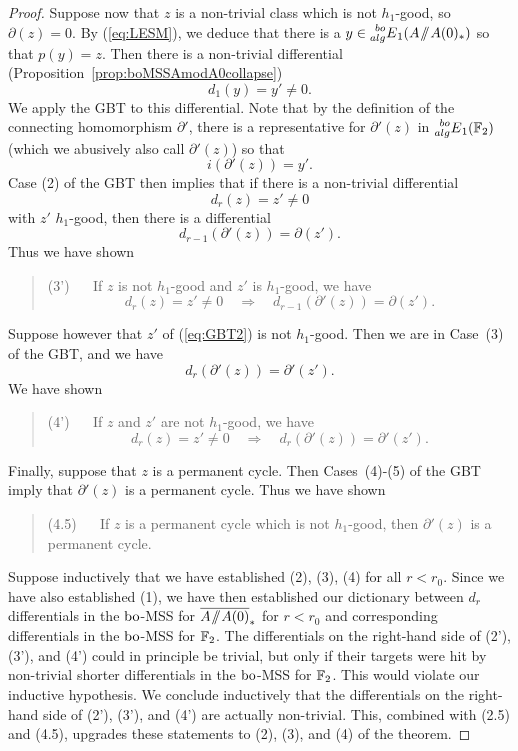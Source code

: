 \begin{proof}
Suppose now that $z$ is a non-trivial class which is not $h_1$-good, so $\partial(z) = 0$.  By (\ref{eq:LESM}), we deduce that there is a $y \in \prescript{bo}{alg}{E}_1(A \! \sslash \! A(0)_*)$ so that $p(y) = z$.  Then there is a non-trivial differential (Proposition~\ref{prop:boMSSAmodA0collapse}) 
$$ d_1(y) = y' \ne 0. $$
We apply the GBT to this differential.  Note that by the definition of the connecting homomorphism $\partial'$, there is a representative for $\partial'(z)$ in $\prescript{bo}{alg}{E}_{1}(\mathbb{F}_2)$ (which we abusively also call $\partial'(z)$) so that
$$ i(\partial'(z)) = y'. $$
Case (2) of the GBT then implies that if there is a non-trivial differential
\begin{equation}\label{eq:GBT2}
d_{r}(z) = z' \ne 0
\end{equation}
with $z'$ $h_1$-good,
then there is a differential
$$ d_{r-1}(\partial'(z)) = \partial(z'). $$
Thus we have shown
\begin{quote}
(3') $\quad$ If $z$ is not $h_1$-good and $z'$ is $h_1$-good, we have
$$ d_{r}(z) = z' \ne 0 \quad \Rightarrow \quad d_{r-1}(\partial'(z)) = \partial(z'). $$
\end{quote}
Suppose however that $z'$ of (\ref{eq:GBT2}) is not $h_1$-good.  Then we are in Case~(3) of the GBT, and we have
$$ d_r(\partial'(z)) = \partial'(z'). $$  
We have shown
\begin{quote}
(4') $\quad$ If $z$ and $z'$ are not $h_1$-good, we have
$$ d_{r}(z) = z' \ne 0 \quad \Rightarrow \quad d_{r}(\partial'(z)) = \partial'(z'). $$
\end{quote}
Finally, suppose that $z$ is a permanent cycle.  Then Cases~(4)-(5) of the GBT imply that $\partial'(z)$
is a permanent cycle.  Thus we have shown
\begin{quote}
(4.5) $\quad$ If $z$ is a permanent cycle which is not $h_1$-good, then $\partial'(z)$ is a permanent cycle.
\end{quote}



Suppose inductively that we have established (2), (3), (4) for all $r < r_0$. Since we have also established (1), we have then established our dictionary between $d_r$ differentials in the $\mathrm{bo}$-MSS for $\AA0$ for $r < r_0$ and corresponding differentials in the $\mathrm{bo}$-MSS for $\mathbb{F}_2$.  The differentials on the right-hand side of (2'), (3'), and (4') could in principle be trivial, but only if their targets were hit by non-trivial shorter differentials in the $\mathrm{bo}$-MSS for $\mathbb{F}_2$.  This would violate our inductive hypothesis.  We conclude inductively that the differentials on the right-hand side of (2'), (3'), and (4') are actually non-trivial.  This, combined with (2.5) and (4.5), upgrades these statements to (2), (3), and (4) of the theorem.
\end{proof}
